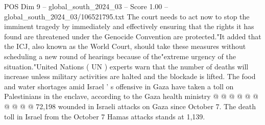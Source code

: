 \begin{textsample}{POS Dim 9 – global\_south\_2024\_03 – Score 1.00 – global\_south\_2024\_03/106521795.txt}
The court needs to act now to stop the imminent tragedy by immediately and effectively ensuring that the rights it has found are threatened under the Genocide Convention are protected."It added that the ICJ, also known as the World Court, should take these measures without scheduling a new round of hearings because of the"extreme urgency of the situation."United Nations ( UN ) experts warn that the number of deaths will increase unless military activities are halted and the blockade is lifted.
The food and water shortages amid Israel ' s offensive in Gaza have taken a toll on Palestinians in the enclave, according to the Gaza health ministry @ @ @ @ @ @ @ @ @ @ 72,198 wounded in Israeli attacks on Gaza since October 7.
The death toll in Israel from the October 7 Hamas attacks stands at 1,139.

\end{textsample}
